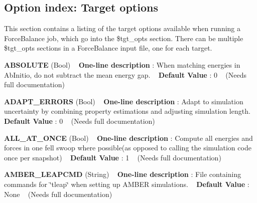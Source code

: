 \hypertarget{glossary_tgt_option_index}{}\subsection{Option index\+: Target options}\label{glossary_tgt_option_index}
This section contains a listing of the target options available when running a Force\+Balance job, which go into the \$tgt\+\_\+opts section. There can be multiple \$tgt\+\_\+opts sections in a Force\+Balance input file, one for each target.

\begin{DoxyItemize}
\item {\bfseries  A\+B\+S\+O\+L\+U\+TE } (Bool) ~\newline
{\bfseries  One-\/line description }\+: When matching energies in Ab\+Initio, do not subtract the mean energy gap. ~\newline
{\bfseries  Default Value }\+: 0 ~\newline
(Needs full documentation)\end{DoxyItemize}
\begin{DoxyItemize}
\item {\bfseries  A\+D\+A\+P\+T\+\_\+\+E\+R\+R\+O\+RS } (Bool) ~\newline
{\bfseries  One-\/line description }\+: Adapt to simulation uncertainty by combining property estimations and adjusting simulation length. ~\newline
{\bfseries  Default Value }\+: 0 ~\newline
(Needs full documentation)\end{DoxyItemize}
\begin{DoxyItemize}
\item {\bfseries  A\+L\+L\+\_\+\+A\+T\+\_\+\+O\+N\+CE } (Bool) ~\newline
{\bfseries  One-\/line description }\+: Compute all energies and forces in one fell swoop where possible(as opposed to calling the simulation code once per snapshot) ~\newline
{\bfseries  Default Value }\+: 1 ~\newline
(Needs full documentation)\end{DoxyItemize}
\begin{DoxyItemize}
\item {\bfseries  A\+M\+B\+E\+R\+\_\+\+L\+E\+A\+P\+C\+MD } (String) ~\newline
{\bfseries  One-\/line description }\+: File containing commands for \char`\"{}tleap\char`\"{} when setting up A\+M\+B\+ER simulations. ~\newline
{\bfseries  Default Value }\+: None ~\newline
(Needs full documentation)\end{DoxyItemize}
